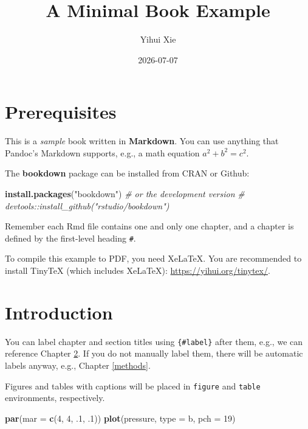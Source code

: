 \documentclass[
]{book}
\title{A Minimal Book Example}
\author{Yihui Xie}
\date{2026-07-07}
\newenvironment{Shaded}{\begin{snugshade}}{\end{snugshade}}
\newcommand{\AttributeTok}[1]{\textcolor[rgb]{0.13,0.29,0.53}{#1}}
\newcommand{\CommentTok}[1]{\textcolor[rgb]{0.56,0.35,0.01}{\textit{#1}}}
\newcommand{\DecValTok}[1]{\textcolor[rgb]{0.00,0.00,0.81}{#1}}
\newcommand{\FunctionTok}[1]{\textcolor[rgb]{0.13,0.29,0.53}{\textbf{#1}}}
\newcommand{\NormalTok}[1]{#1}
\newcommand{\StringTok}[1]{\textcolor[rgb]{0.31,0.60,0.02}{#1}}
\begin{document}
\maketitle

{
\setcounter{tocdepth}{1}
\tableofcontents
}
\chapter{Prerequisites}\label{prerequisites}

This is a \emph{sample} book written in \textbf{Markdown}. You can use anything that Pandoc's Markdown supports, e.g., a math equation \(a^2 + b^2 = c^2\).

The \textbf{bookdown} package can be installed from CRAN or Github:

\begin{Shaded}
\begin{Highlighting}[]
\FunctionTok{install.packages}\NormalTok{(}\StringTok{"bookdown"}\NormalTok{)}
\CommentTok{\# or the development version}
\CommentTok{\# devtools::install\_github("rstudio/bookdown")}
\end{Highlighting}
\end{Shaded}

Remember each Rmd file contains one and only one chapter, and a chapter is defined by the first-level heading \texttt{\#}.

To compile this example to PDF, you need XeLaTeX. You are recommended to install TinyTeX (which includes XeLaTeX): \url{https://yihui.org/tinytex/}.

\chapter{Introduction}\label{intro}

You can label chapter and section titles using \texttt{\{\#label\}} after them, e.g., we can reference Chapter \ref{intro}. If you do not manually label them, there will be automatic labels anyway, e.g., Chapter \ref{methods}.

Figures and tables with captions will be placed in \texttt{figure} and \texttt{table} environments, respectively.

\begin{Shaded}
\begin{Highlighting}[]
\FunctionTok{par}\NormalTok{(}\AttributeTok{mar =} \FunctionTok{c}\NormalTok{(}\DecValTok{4}\NormalTok{, }\DecValTok{4}\NormalTok{, .}\DecValTok{1}\NormalTok{, .}\DecValTok{1}\NormalTok{))}
\FunctionTok{plot}\NormalTok{(pressure, }\AttributeTok{type =} \StringTok{\textquotesingle{}b\textquotesingle{}}\NormalTok{, }\AttributeTok{pch =} \DecValTok{19}\NormalTok{)}
\end{Highlighting}
\end{Shaded}
\end{document}
